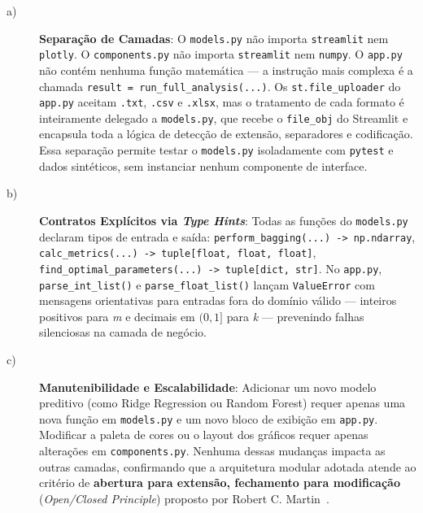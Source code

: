 \begin{description}

\item[a)] \textbf{Separação de Camadas}: O \texttt{models.py} não importa
\texttt{streamlit} nem \texttt{plotly}. O \texttt{components.py} não importa
\texttt{streamlit} nem \texttt{numpy}. O \texttt{app.py} não contém nenhuma função
matemática — a instrução mais complexa é a chamada \texttt{result =
run\_full\_analysis(...)}. Os \texttt{st.file\_uploader} do \texttt{app.py} aceitam
\texttt{.txt}, \texttt{.csv} e \texttt{.xlsx}, mas o tratamento de cada formato é
inteiramente delegado a \texttt{models.py}, que recebe o \texttt{file\_obj} do Streamlit
e encapsula toda a lógica de detecção de extensão, separadores e codificação.
Essa separação permite testar o \texttt{models.py}
isoladamente com \texttt{pytest} e dados sintéticos, sem instanciar nenhum componente de
interface.

\item[b)] \textbf{Contratos Explícitos via \textit{Type Hints}}: Todas as funções do
\texttt{models.py} declaram tipos de entrada e saída:
\texttt{perform\_bagging(...) -> np.ndarray},
\texttt{calc\_metrics(...) -> tuple[float, float, float]},
\texttt{find\_optimal\_parameters(...) -> tuple[dict, str]}.
No \texttt{app.py}, \texttt{parse\_int\_list()} e \texttt{parse\_float\_list()} lançam
\texttt{ValueError} com mensagens orientativas para entradas fora do domínio válido —
inteiros positivos para \textit{m} e decimais em $(0,1]$ para \textit{k} — prevenindo
falhas silenciosas na camada de negócio.

\item[c)] \textbf{Manutenibilidade e Escalabilidade}: Adicionar um novo modelo preditivo
(como Ridge Regression ou Random Forest) requer apenas uma nova função em
\texttt{models.py} e um novo bloco de exibição em \texttt{app.py}. Modificar a paleta de
cores ou o layout dos gráficos requer apenas alterações em \texttt{components.py}.
Nenhuma dessas mudanças impacta as outras camadas, confirmando que a arquitetura modular
adotada atende ao critério de \textbf{abertura para extensão, fechamento para
modificação} (\textit{Open/Closed Principle}) proposto por Robert C.
Martin~\cite{martin2008}.

\end{description}

